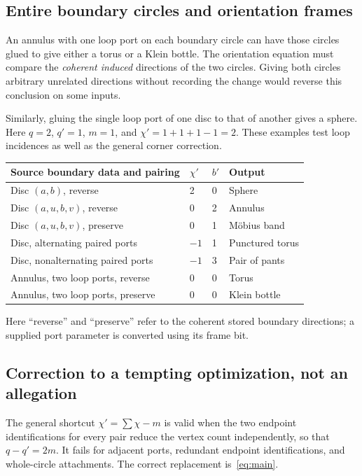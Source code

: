 \documentclass[11pt]{article}
\theoremstyle{definition}
\theoremstyle{remark}\newtheorem{remark}[theorem]{Remark}
\begin{document}
\subsection{Entire boundary circles and orientation frames}
An annulus with one loop port on each boundary circle can have those circles glued to give either a torus or a Klein bottle. The orientation equation must compare the \emph{coherent induced} directions of the two circles. Giving both circles arbitrary unrelated directions without recording the change would reverse this conclusion on some inputs.

Similarly, gluing the single loop port of one disc to that of another gives a sphere. Here $q=2$, $q'=1$, $m=1$, and $\chi'=1+1+1-1=2$. These examples test loop incidences as well as the general corner correction.

\begin{center}\small
\begin{tabularx}{\textwidth}{@{}Xlll@{}}\toprule
Source boundary data and pairing & $\chi'$ & $b'$ & Output\\\midrule
Disc $(a,b)$, reverse & 2 & 0 & Sphere\\
Disc $(a,u,b,v)$, reverse & 0 & 2 & Annulus\\
Disc $(a,u,b,v)$, preserve & 0 & 1 & M\"obius band\\
Disc, alternating paired ports & $-1$ & 1 & Punctured torus\\
Disc, nonalternating paired ports & $-1$ & 3 & Pair of pants\\
Annulus, two loop ports, reverse & 0 & 0 & Torus\\
Annulus, two loop ports, preserve & 0 & 0 & Klein bottle\\\bottomrule
\end{tabularx}
\end{center}
Here ``reverse'' and ``preserve'' refer to the coherent stored boundary directions; a supplied port parameter is converted using its frame bit.

\subsection{Correction to a tempting optimization, not an allegation}
The general shortcut $\chi'=\sum\chi-m$ is valid when the two endpoint identifications for every pair reduce the vertex count independently, so that $q-q'=2m$. It fails for adjacent ports, redundant endpoint identifications, and whole-circle attachments. The correct replacement is~\eqref{eq:main}.
\end{document}
